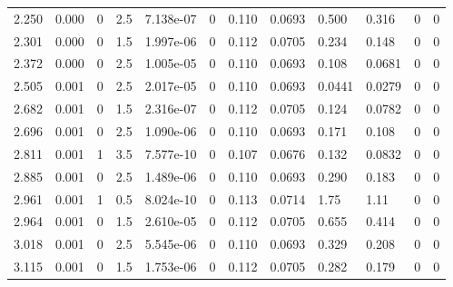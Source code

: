 \documentclass[preview]{standalone}
\begin{document}
{{\begin{tabular}{L{1.2cm}C{1.2cm} C{0.3cm}C{0.5cm} C{1.4cm}C{1.4cm} C{1.4cm}C{1.4cm} C{1.6cm}C{1.6cm} C{1.6cm}C{1.6cm}}
  2.250  &  0.000  & 0     & 2.5 &  7.138e-07  & 0  &  0.110&   0.0693& 0.500 & 0.316   &  0 & 0  \\ 
  2.301  &  0.000  & 0     & 1.5 &  1.997e-06  & 0  &  0.112&   0.0705& 0.234 & 0.148   &  0 & 0  \\ 
  2.372  &  0.000  & 0     & 2.5 &  1.005e-05  & 0  &  0.110&   0.0693& 0.108 & 0.0681   &  0 & 0  \\ 
  2.505  &  0.001  & 0     & 2.5 &  2.017e-05  & 0  &  0.110&   0.0693& 0.0441 & 0.0279   &  0 & 0  \\ 
  2.682  &  0.001  & 0     & 1.5 &  2.316e-07  & 0  &  0.112&   0.0705& 0.124 & 0.0782   &  0 & 0  \\ 
  2.696  &  0.001  & 0     & 2.5 &  1.090e-06  & 0  &  0.110&   0.0693& 0.171 & 0.108   &  0 & 0  \\ 
  2.811  &  0.001  & 1     & 3.5 &  7.577e-10  & 0  &  0.107&   0.0676& 0.132 & 0.0832   &  0 & 0  \\ 
  2.885  &  0.001  & 0     & 2.5 &  1.489e-06  & 0  &  0.110&   0.0693& 0.290 & 0.183   &  0 & 0  \\ 
  2.961  &  0.001  & 1     & 0.5 &  8.024e-10  & 0  &  0.113&   0.0714& 1.75 & 1.11   &  0 & 0  \\ 
  2.964  &  0.001  & 0     & 1.5 &  2.610e-05  & 0  &  0.112&   0.0705& 0.655 & 0.414   &  0 & 0  \\ 
  3.018  &  0.001  & 0     & 2.5 &  5.545e-06  & 0  &  0.110&   0.0693& 0.329 & 0.208   &  0 & 0  \\ 
  3.115  &  0.001  & 0     & 1.5 &  1.753e-06  & 0  &  0.112&   0.0705& 0.282 & 0.179   &  0 & 0  \\ 
\hline 
\end{tabular} 

}}
\end{document}
